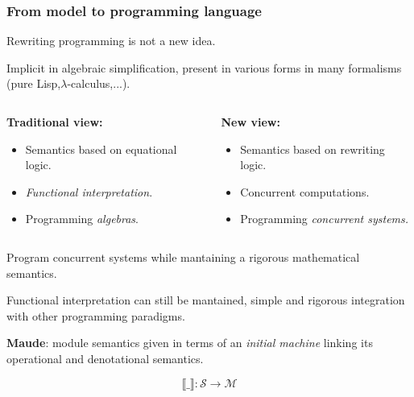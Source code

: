 \documentclass{beamer}
\begin{document}
\begin{frame}
    \scriptsize
    \frametitle{From model to programming language}
    Rewriting programming is not a new idea.

    \bigskip
    Implicit in algebraic simplification, present in various forms in many formalisms (pure Lisp,$\lambda$-calculus,...).

    \bigskip
    \begin{columns}[t,onlytextwidth]
        \begin{column}{.5\textwidth}
            \textbf{Traditional view:}
            
            \begin{itemize}
                \item Semantics based on equational logic.
                \item \emph{Functional interpretation}.
                \item Programming \emph{algebras}.
            \end{itemize}
        \end{column}
        \begin{column}{.5\textwidth}
            \textbf{New view:}
            \begin{itemize}
                \item Semantics based on rewriting logic.
                \item Concurrent computations.
                \item Programming \emph{concurrent systems.}
            \end{itemize}
        \end{column}

        
    \end{columns}

    \bigskip
    Program concurrent systems while mantaining a rigorous mathematical semantics.
    
    \bigskip
    Functional interpretation can still be mantained, simple and rigorous integration with other programming paradigms.

    \bigskip
    \textbf{Maude}: module semantics given in terms of an \emph{initial machine} linking its operational and denotational semantics.

    $$ \llbracket \_ \rrbracket: \mathcal{S} \rightarrow \mathcal{M}$$
\end{frame}
\end{document}
